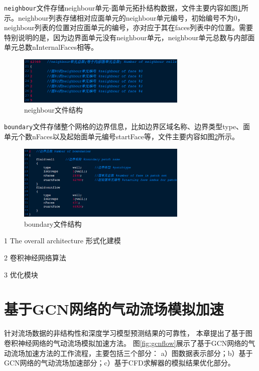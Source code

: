 \texttt{neighbour}文件存储neighbour单元-面单元拓扑结构数据，文件主要内容如图\ref{fig:neighbour_file}所示。neighbour列表存储相对应面单元的neighbour单元编号，初始编号不为0，neighbour列表的位置对应面单元的编号，亦对应于其在faces列表中的位置。需要特别说明的是，因为边界面单元没有neighbour单元，neighbour单元总数与内部面单元总数nInternalFaces相等。

\begin{figure}[htp]
	\centering
	\includegraphics[width=0.72\textwidth]{./figures/neighbour.png}
	\caption{neighbour文件结构}
	\label{fig:neighbour_file}	
\end{figure}

\texttt{boundary}文件存储整个网格的边界信息，比如边界区域名称、边界类型type、面单元个数nFaces以及起始面单元编号startFace等，文件主要内容如图\ref{fig:boundary_file}所示。

\begin{figure}[htp]
	\centering
	\includegraphics[width=0.72\textwidth]{./figures/boundary.png}
	\caption{boundary文件结构}
	\label{fig:boundary_file}	
\end{figure}







1 The overall architecture
形式化建模

2 卷积神经网络算法

3 优化模块

\section{基于GCN网络的气动流场模拟加速}

针对流场数据的非结构性和深度学习模型预测结果的可靠性，
本章提出了基于图卷积神经网络的气动流场模拟加速方法。
图\ref{fig:gcnflow}展示了基于GCN网络的气动流场加速方法的工作流程，主要包括三个部分：
a）图数据表示部分；b）基于GCN网络的气动流场加速部分；c）基于CFD求解器的模拟结果优化部分。

